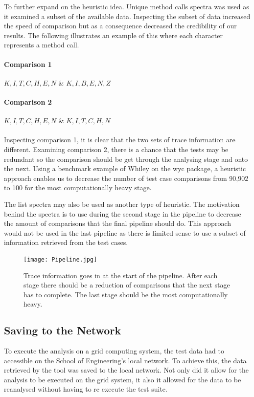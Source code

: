 To further expand on the heuristic idea. Unique method calls spectra was used as it examined a subset of the available data. Inspecting the subset of data increased the speed of comparison but as a consequence decreased the credibility of our results. The following illustrates an example of this where each character represents a method call.
\paragraph{Comparison 1}
$K,I,T,C,H,E,N$ \& $K,I,B,E,N,Z $
\paragraph{Comparison 2}
$K,I,T,C,H,E,N$ \& $K,I,T,C,H,N$
\paragraph{}
Inspecting comparison 1, it is clear that the two sets of trace information are different. Examining comparison 2, there is a chance that the tests may be redundant so the comparison should be get through the analysing stage and onto the next. Using a benchmark example of Whiley on the wyc package, a heuristic approach enables us to decrease the number of test case comparisons from 90,902 to 100 for the most computationally heavy stage.

The list spectra may also be used as another type of heuristic. The motivation behind the spectra is to use during the second stage in the pipeline to decrease the amount of comparisons that the final pipeline should do. This approach would not be used in the last pipeline as there is limited sense to use a subset of information retrieved from the test cases.

\begin{figure}[h]
\texttt{[image: Pipeline.jpg]}
\caption{Trace information goes in at the start of the pipeline. After each stage there should be a reduction of comparisons that the next stage has to complete. The last stage should be the most computationally heavy.}
\label{fig:pipeline}
\end{figure}

\subsection{Saving to the Network}
To execute the analysis on a grid computing system, the test data had to accessible on the School of Engineering's local network. To achieve this, the data retrieved by the tool was saved to the local network. Not only did it allow for the analysis to be executed on the grid system, it also it allowed for the data to be reanalysed without having to re execute the test suite. 

